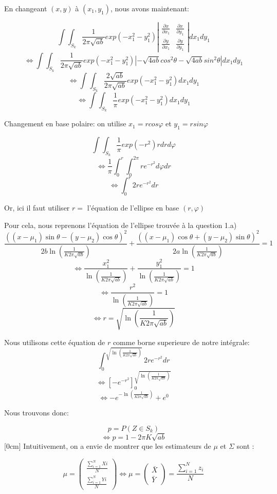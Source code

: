 \documentclass{article}
\begin{document}
En changeant $(x,y)$ à $(x_1,y_1)$, nous avons maintenant:

$$\int\int_{S_k}^{} \frac{1}{2\pi\sqrt{ab}}exp(-x_1^2-y_1^2)\left| \begin{matrix}\frac{\partial x}{\partial x_1}
    &  \frac{\partial x}{\partial y_1}
     \\\frac{\partial y}{\partial x_1}
    & \frac{\partial y}{\partial y_1}
\end{matrix} \right|dx_1dy_1$$
$$\Leftrightarrow \int\int_{S_k}^{} \frac{1}{2\pi\sqrt{ab}}exp(-x_1^2-y_1^2)\left| -\sqrt{4ab}cos^2\theta -\sqrt{4ab}sin^2\theta\right|dx_1dy_1$$
$$\Leftrightarrow \int\int_{S_k}^{} \frac{2\sqrt{ab}}{2\pi\sqrt{ab}}exp(-x_1^2-y_1^2)dx_1dy_1$$
$$\Leftrightarrow \int\int_{S_k}^{} \frac{1}{\pi}exp(-x_1^2-y_1^2)dx_1dy_1$$

Changement en base polaire: on utilise $x_1=rcos\varphi$ et $y_1=rsin\varphi$

$$\int\int_{S_k}^{} \frac{1}{\pi}exp(-r^2)rdrd\varphi$$
$$\Leftrightarrow \frac{1}{\pi}\int_{0}^{r}\int_{0}^{2\pi} re^{-r^2}d\varphi dr$$
$$\Leftrightarrow \int_{0}^{r} 2re^{-r^2} dr$$

Or, ici il faut utiliser $r=$ l'équation de l'ellipse en base $(r,\varphi)$

Pour cela, nous reprenons l'équation de l'ellipse trouvée à la question 1.a)
$$\frac{((x-\mu_1)\sin\theta-(y-\mu_2)\cos\theta)^{2}}{2b\ln(\frac{1}{K2\pi\sqrt{ab}})}+\frac{((x-\mu_1)\cos\theta+(y-\mu_2)\sin\theta)^{2}}{2a\ln(\frac{1}{K2\pi\sqrt{ab}})}=1$$
$$\Leftrightarrow \frac{x_1^2}{\ln(\frac{1}{K2\pi\sqrt{ab}})}+\frac{y_1^2}{\ln(\frac{1}{K2\pi\sqrt{ab}})}=1$$
$$\Leftrightarrow \frac{r^2}{\ln(\frac{1}{K2\pi\sqrt{ab}})}=1$$
$$\Leftrightarrow r=\sqrt{\ln(\frac{1}{K2\pi\sqrt{ab}})}$$

Nous utilisons cette équation de $r$ comme borne superieure de notre intégrale:
$$\int_{0}^{\sqrt{\ln(\frac{1}{K2\pi\sqrt{ab}})}} 2re^{-r^2} dr$$
$$\Leftrightarrow \left[ -e^{-r^2} \right]_{0}^{\sqrt{\ln(\frac{1}{K2\pi\sqrt{ab}})}}$$
$$\Leftrightarrow -e^{-\ln(\frac{1}{K2\pi\sqrt{ab}})}+e^0$$

Nous trouvons donc:

$$p=P(Z \in S_k)$$
$$\Leftrightarrow p=1-2\pi K\sqrt{ab}$$
$$$$
\reversemarginpar{}[0cm]
Intuitivement, on a envie de montrer que les estimateurs de $\mu$ et $\Sigma$ sont :

\[
\mu = \begin{pmatrix} \frac{\sum_{i=1}^{N}Xi}{N} \\ \frac{\sum_{i=1}^{N}Yi}{N} \end{pmatrix} \Leftrightarrow \mu = \begin{pmatrix} \bar{X} \\ \bar{Y} \end{pmatrix} = \frac{\sum_{i=1}^{N}z_i}{N}
\]
\end{document}
